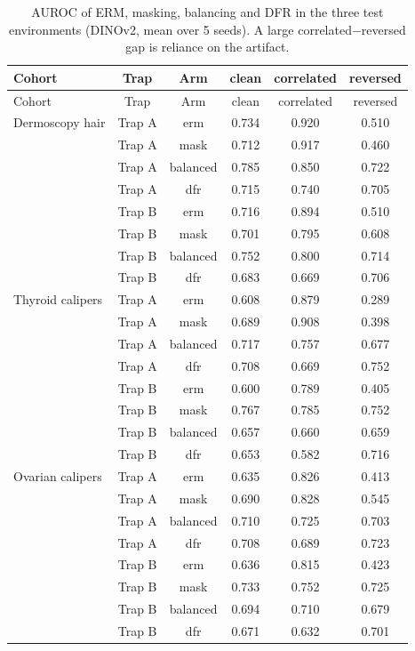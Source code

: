 {\scriptsize
\begin{longtable}{lccccc}
\caption{AUROC of ERM, masking, balancing and DFR in the three test environments (DINOv2, mean over 5 seeds). A large correlated$-$reversed gap is reliance on the artifact.}\label{tab:aucenv}\\\toprule
Cohort & Trap & Arm & clean & correlated & reversed \\\midrule
\endfirsthead
\toprule Cohort & Trap & Arm & clean & correlated & reversed \\\midrule
\endhead
\bottomrule
\endlastfoot
Dermoscopy hair & Trap A & erm & 0.734 & 0.920 & 0.510 \\
 & Trap A & mask & 0.712 & 0.917 & 0.460 \\
 & Trap A & balanced & 0.785 & 0.850 & 0.722 \\
 & Trap A & dfr & 0.715 & 0.740 & 0.705 \\
 & Trap B & erm & 0.716 & 0.894 & 0.510 \\
 & Trap B & mask & 0.701 & 0.795 & 0.608 \\
 & Trap B & balanced & 0.752 & 0.800 & 0.714 \\
 & Trap B & dfr & 0.683 & 0.669 & 0.706 \\
Thyroid calipers & Trap A & erm & 0.608 & 0.879 & 0.289 \\
 & Trap A & mask & 0.689 & 0.908 & 0.398 \\
 & Trap A & balanced & 0.717 & 0.757 & 0.677 \\
 & Trap A & dfr & 0.708 & 0.669 & 0.752 \\
 & Trap B & erm & 0.600 & 0.789 & 0.405 \\
 & Trap B & mask & 0.767 & 0.785 & 0.752 \\
 & Trap B & balanced & 0.657 & 0.660 & 0.659 \\
 & Trap B & dfr & 0.653 & 0.582 & 0.716 \\
Ovarian calipers & Trap A & erm & 0.635 & 0.826 & 0.413 \\
 & Trap A & mask & 0.690 & 0.828 & 0.545 \\
 & Trap A & balanced & 0.710 & 0.725 & 0.703 \\
 & Trap A & dfr & 0.708 & 0.689 & 0.723 \\
 & Trap B & erm & 0.636 & 0.815 & 0.423 \\
 & Trap B & mask & 0.733 & 0.752 & 0.725 \\
 & Trap B & balanced & 0.694 & 0.710 & 0.679 \\
 & Trap B & dfr & 0.671 & 0.632 & 0.701 \\

\end{longtable}}
